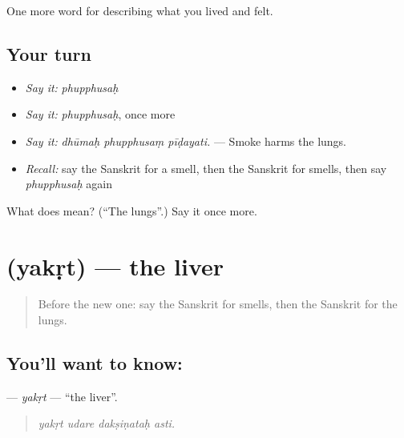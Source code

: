 \begin{grammarlens}[title={What you've built}]
One more word for describing what you lived and felt.
\end{grammarlens}

\subsection*{Your turn}
\begin{itemize}
\raggedright
  \item \emph{Say it:} \emph{phupphusaḥ}
  \item \emph{Say it:} \emph{phupphusaḥ}, once more
  \item \emph{Say it:} \emph{dhūmaḥ phupphusaṃ pīḍayati.} — Smoke harms the lungs.
  \item \emph{Recall:} say the Sanskrit for a smell, then the Sanskrit for smells, then say \emph{phupphusaḥ} again
\end{itemize}

\begin{tcolorbox}[breakable,colback=teal!4,colframe=teal!35!black,title={Before you move on}]
What does  mean? (\textquotedblleft{}The lungs\textquotedblright{}.) Say it once more.
\end{tcolorbox}
\section[\texorpdfstring{\sk{यकृत्} (yakṛt)}{यकृत् (yakṛt)}]{ (yakṛt) — the liver}

\label{lesson:SA-C470-yakrt}



\begin{quote}
Before the new one: say the Sanskrit for smells, then the Sanskrit for the lungs.
\end{quote}

\subsection*{You'll want to know: }
\textbf{} — \emph{yakṛt} — \textquotedblleft{}the liver\textquotedblright{}.

\begin{quote}
   
\end{quote}

\begin{quote}
\emph{yakṛt udare dakṣiṇataḥ asti.}
\end{quote}

